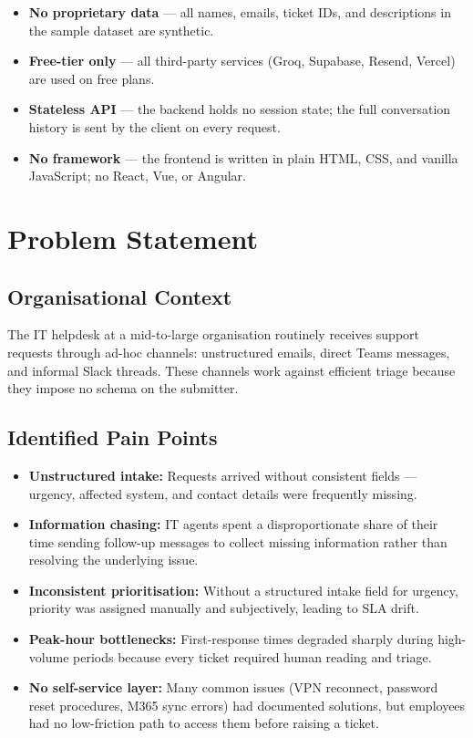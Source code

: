\documentclass[12pt, a4paper]{article}
\begin{document}
\begin{itemize}[leftmargin=*]
  \item \textbf{No proprietary data} — all names, emails, ticket IDs, and descriptions in
        the sample dataset are synthetic.
  \item \textbf{Free-tier only} — all third-party services (Groq, Supabase, Resend, Vercel)
        are used on free plans.
  \item \textbf{Stateless API} — the backend holds no session state; the full conversation
        history is sent by the client on every request.
  \item \textbf{No framework} — the frontend is written in plain HTML, CSS, and vanilla
        JavaScript; no React, Vue, or Angular.
\end{itemize}

\section{Problem Statement}

\subsection{Organisational Context}

The IT helpdesk at a mid-to-large organisation routinely receives support requests through
ad-hoc channels: unstructured emails, direct Teams messages, and informal Slack threads.
These channels work against efficient triage because they impose no schema on the submitter.

\subsection{Identified Pain Points}

\begin{itemize}[leftmargin=*]
  \item \textbf{Unstructured intake:} Requests arrived without consistent fields — urgency,
        affected system, and contact details were frequently missing.
  \item \textbf{Information chasing:} IT agents spent a disproportionate share of their
        time sending follow-up messages to collect missing information rather than resolving
        the underlying issue.
  \item \textbf{Inconsistent prioritisation:} Without a structured intake field for urgency,
        priority was assigned manually and subjectively, leading to SLA drift.
  \item \textbf{Peak-hour bottlenecks:} First-response times degraded sharply during
        high-volume periods because every ticket required human reading and triage.
  \item \textbf{No self-service layer:} Many common issues (VPN reconnect, password reset
        procedures, M365 sync errors) had documented solutions, but employees had no
        low-friction path to access them before raising a ticket.
\end{itemize}
\end{document}
